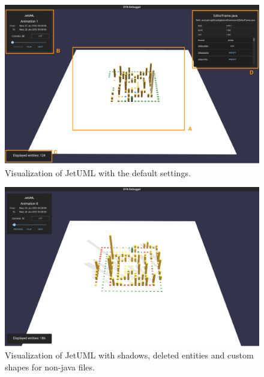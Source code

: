 \begin{figure}
    \center
    \includegraphics[width=\textwidth]{SYNUI-fileHistory.png}
    \caption{Visualization of JetUML with the default settings.}
    \label{fig:fileHistories}
\end{figure}

\begin{figure}
    \center
    \includegraphics[width=\textwidth]{SYNUI-deletedshadow.png}
    \caption{Visualization of JetUML with shadows, deleted entities and custom shapes for non-java files.}
    \label{fig:deletedshadow}
\end{figure}